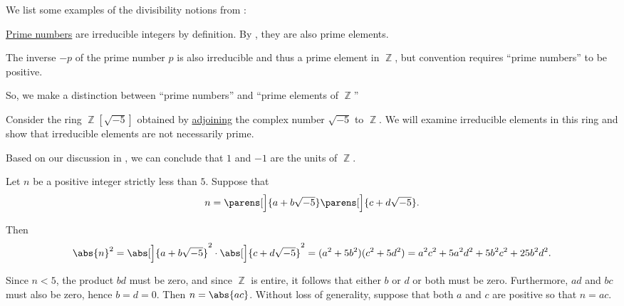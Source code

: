 \begin{example}\label{ex:def:domain_divisibility}
  We list some examples of the divisibility notions from :
  \begin{thmenum}
     \hyperref[def:prime_number]{Prime numbers} are irreducible integers by definition. By , they are also prime elements.

    The inverse \( -p \) of the prime number \( p \) is also irreducible and thus a prime element in \( \BbbZ \), but convention requires \enquote{prime numbers} to be positive.

    So, we make a distinction between \enquote{prime numbers} and \enquote{prime elements of \( \BbbZ \)}

     Consider the ring \( \BbbZ[\sqrt{-5}] \) obtained by \hyperref[def:semiring_adjunction]{adjoining} the complex number \( \sqrt{-5} \) to \( \BbbZ \). We will examine irreducible elements in this ring and show that irreducible elements are not necessarily prime.

    Based on our discussion in , we can conclude that \( 1 \) and \( -1 \) are the units of \( \BbbZ \).

    Let \( n \) be a positive integer strictly less than \( 5 \). Suppose that
    \begin{equation}\label{eq:ex:def:domain_divisibility/irreducible_not_prime/decomposition}
      n = \parens[\Big]{ a + b \sqrt{-5} }\parens[\Big]{ c + d \sqrt{-5}}.
    \end{equation}

    Then
    \begin{equation}\label{eq:ex:def:domain_divisibility/irreducible_not_prime/abs}
      \abs{n}^2
      =
      \abs[\Big]{a + b \sqrt{-5}}^2 \cdot \abs[\Big]{c + d \sqrt{-5}}^2
      =
      (a^2 + 5b^2) (c^2 + 5d^2)
      =
      a^2 c^2 + 5a^2 d^2 + 5b^2 c^2 + 25 b^2 d^2.
    \end{equation}

    Since \( n < 5 \), the product \( bd \) must be zero, and since \( \BbbZ \) is entire, it follows that either \( b \) or \( d \) or both must be zero. Furthermore, \( ad \) and \( bc \) must also be zero, hence \( b = d = 0 \). Then \( n = \abs{ac} \). Without loss of generality, suppose that both \( a \) and \( c \) are positive so that \( n = ac \).


\end{thmenum}
\end{example}
